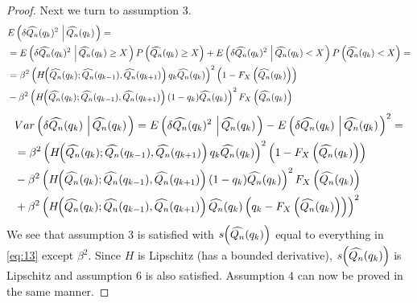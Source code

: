 \documentclass[10pt, a4paper]{article}
\newtheorem{rational for conjecture}{Rational for Conjecture}
\begin{document}
\begin{proof}
Next we turn to assumption 3.
\begin{align*}
  &E\left(\delta \widehat{Q_{n}}(q_k)^2\,\left|\,\widehat{Q_n}(q_k)\right.\right) = \\
  & = E\left(\delta \widehat{Q_{n}}(q_k)^2\,\left|\,\widehat{Q_n}(q_k) \geq X \right.\right) P\left(\widehat{Q_n}(q_k) \geq X \right) + E\left(\delta \widehat{Q_{n}}(q_k)^2\,\left|\,\widehat{Q_n}(q_k) < X\right.\right) P\left(\widehat{Q_n}(q_k) < X\right) = \\
  & = \beta^2 \left( H\hspace{-1mm}\left(\widehat{Q_{n}}(q_{k}); \widehat{Q_{n}}(q_{k-1}), \widehat{Q_{n}}(q_{k+1}) \right) q_k \widehat{Q_{n}}(q_{k}) \right)^2 \left(1 - F_X\left(\widehat{Q_{n}}(q_{k})\right)\right) \\
  & - \beta^2 \left(H\hspace{-1mm}\left(\widehat{Q_{n}}(q_{k}); \widehat{Q_{n}}(q_{k-1}), \widehat{Q_{n}}(q_{k+1}) \right) (1 - q_k) \widehat{Q_{n}}(q_{k}) \right)^2 F_X\left(\widehat{Q_{n}}(q_{k})\right)
\end{align*}
\begin{align}
  \label{eq:13}
  \begin{split}
  & Var\left(\delta \widehat{Q_{n}}(q_k)\,\left|\,\widehat{Q_n}(q_k)\right.\right) = E\left(\delta \widehat{Q_{n}}(q_k)^2\,\left|\,\widehat{Q_n}(q_k)\right.\right) - E\left(\delta \widehat{Q_{n}}(q_k)\,\left|\,\widehat{Q_n}(q_k)\right.\right)^2 = \\
  & = \beta^2 \left( H\hspace{-1mm}\left(\widehat{Q_{n}}(q_{k}); \widehat{Q_{n}}(q_{k-1}), \widehat{Q_{n}}(q_{k+1}) \right) q_k \widehat{Q_{n}}(q_{k}) \right)^2 \left(1 - F_X\left(\widehat{Q_{n}}(q_{k})\right)\right) \\
  & - \beta^2 \left(H\hspace{-1mm}\left(\widehat{Q_{n}}(q_{k}); \widehat{Q_{n}}(q_{k-1}), \widehat{Q_{n}}(q_{k+1}) \right) (1 - q_k) \widehat{Q_{n}}(q_{k}) \right)^2 F_X\left(\widehat{Q_{n}}(q_{k})\right) \\
  & + \beta^2 \left( H\hspace{-1mm}\left(\widehat{Q_{n}}(q_{k}); \widehat{Q_{n}}(q_{k-1}), \widehat{Q_{n}}(q_{k+1}) \right) \widehat{Q_{n}}(q_{k}) \left(q_k - F_X\left(\widehat{Q_{n}}(q_{k})\right)\right)\right)^2
  \end{split}
\end{align}
We see that assumption 3 is satisfied with $s\hspace{-0.7mm}\left(\widehat{Q_{n}}(q_{k})\right)$ equal to everything in \eqref{eq:13} except $\beta^2$. Since $H$ is Lipschitz (has a bounded derivative), $s\hspace{-0.7mm}\left(\widehat{Q_{n}}(q_{k})\right)$ is Lipschitz and assumption 6 is also satisfied. Assumption 4 can now be proved in the same manner.


\end{proof}
\end{document}
